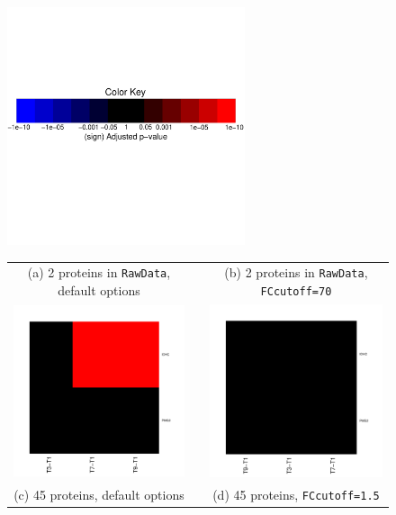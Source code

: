 \documentclass[11pt]{article}
\begin{document}
\begin{figure}[h!]
\begin{center}
\includegraphics[width=2.75in]{Heatmap_colorkey.pdf} \\
\vspace{0.3cm}
\begin{tabular}{ccc}
{\footnotesize (a) 2 proteins in {\tt RawData}, default options}& & {\footnotesize (b) 2 proteins in {\tt RawData}, {\tt FCcutoff=70}} \\
\includegraphics[width=2.25in]{HeatmapYeast1.pdf}&&
\includegraphics[width=2.25in]{HeatmapYeast2.pdf}\\ [0.15in]
{\footnotesize (c) 45 proteins, default options}& & {\footnotesize (d) 45 proteins, {\tt FCcutoff=1.5} } \\

\end{tabular}
\end{center}
\end{figure}
\end{document}
